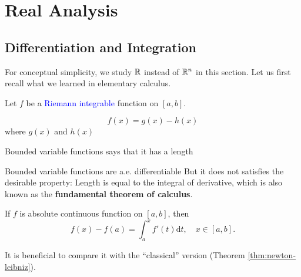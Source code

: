 \chapter{Real Analysis}


\section{}


\section{Differentiation and Integration}
For conceptual simplicity, we study $\mathbb{R}$ instead of $\mathbb{R}^n$ in this section.
Let us first recall what we learned in elementary calculus.
\begin{theorem}\label{thm:newton-leibniz}
        Let \( f \) be a \textcolor{blue}{Riemann integrable} function on \([a,b]\).  
    
\end{theorem}

\begin{definition}
    
\end{definition}

\begin{theorem}
    \begin{equation*}
        f(x)=g(x)-h(x)
    \end{equation*}
    where $g(x)$ and $h(x)$ 
\end{theorem}
Bounded variable functions says that it has a length


Bounded variable functions are a.e. differentiable
But it does not satisfies the desirable property: Length is equal to the integral of derivative,
which is also known as the \textbf{fundamental theorem of calculus}.



\begin{example}
    
\end{example}



\begin{definition}
    
\end{definition}


\begin{theorem}\label{thm:abs-cont}
    If $f$ is absolute continuous function on $[a,b]$, then 
    \begin{equation*}
        f(x)-f(a)=\int_{a}^{x}f'(t)\mathrm{d}t,\quad x\in [a,b].
    \end{equation*}
\end{theorem}

It is beneficial to compare it with the ``classical'' version (Theorem \ref{thm:newton-leibniz}).






